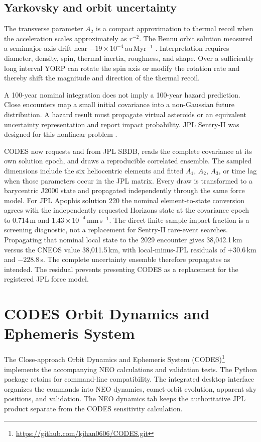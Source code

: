 \subsection{Yarkovsky and orbit uncertainty}

The transverse parameter $A_2$ is a compact approximation to thermal recoil
when the acceleration scales approximately as $r^{-2}$. The Bennu orbit
solution measured a semimajor-axis drift near $-19\times10^{-4}$\,au\,Myr$^{-1}$
\cite{Chesley2014}. Interpretation requires diameter, density, spin, thermal
inertia, roughness, and shape. Over a sufficiently long interval YORP can
rotate the spin axis or modify the rotation rate and thereby shift the
magnitude and direction of the thermal recoil.

A 100-year nominal integration does not imply a 100-year hazard prediction.
Close encounters map a small initial covariance into a non-Gaussian future
distribution. A hazard result must propagate virtual asteroids or an
equivalent uncertainty representation and report impact probability. JPL
Sentry-II was designed for this nonlinear problem \cite{Roa2021}.

CODES now requests  and  from JPL SBDB,
reads the complete covariance at its own solution epoch, and draws a
reproducible correlated ensemble. The sampled dimensions include the six
heliocentric elements and fitted $A_1$, $A_2$, $A_3$, or time lag when those
parameters occur in the JPL matrix. Every draw is transformed to a
barycentric J2000 state and propagated independently through the same force
model. For JPL Apophis solution 220 the nominal element-to-state conversion
agrees with the independently requested Horizons state at the covariance
epoch to 0.714\,m and $1.43\times10^{-4}$\,mm\,s$^{-1}$. The direct
finite-sample impact fraction is a screening diagnostic, not a replacement
for Sentry-II rare-event searches. Propagating that nominal local state to the
2029 encounter gives 38,042.1\,km versus the CNEOS value 38,011.5\,km, with
local-minus-JPL residuals of $+30.6$\,km and $-228.8$\,s. The complete
uncertainty ensemble therefore propagates as intended. The
residual prevents presenting CODES as a replacement for the registered JPL
force model.

\section{CODES Orbit Dynamics and Ephemeris System}

The Close-approach Orbit Dynamics and Ephemeris System
(CODES)\footnote{\url{https://github.com/kjhan0606/CODES.git}} implements the
accompanying NEO calculations and validation tests. The Python package retains
 for command-line compatibility. The integrated
desktop interface organizes the commands into NEO dynamics, comet-orbit
evolution, apparent sky positions, and validation. The NEO dynamics tab keeps
the authoritative JPL product separate from the CODES sensitivity calculation.

